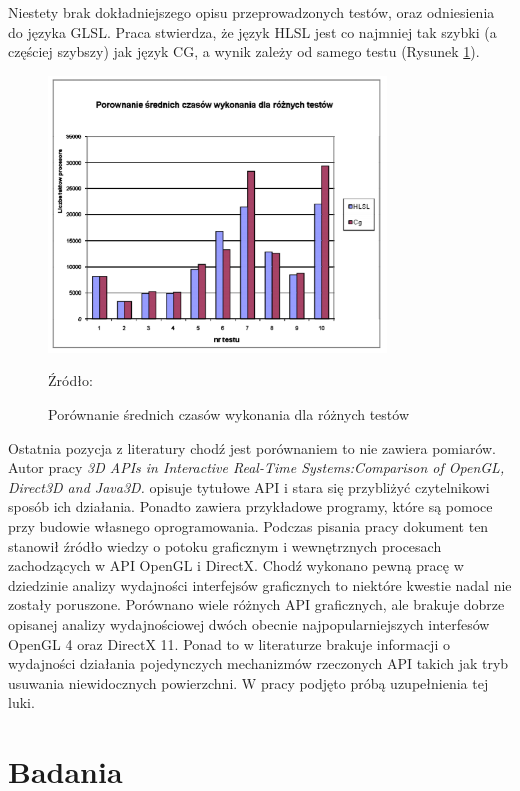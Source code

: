 \documentclass[archive]{mgr}
\begin{document}
Niestety brak dokładniejszego opisu przeprowadzonych testów, oraz odniesienia do języka GLSL. Praca stwierdza, że język HLSL jest co najmniej tak szybki (a częściej szybszy) jak język CG, a wynik zależy od samego testu (Rysunek \ref{lab:liter3}).


\begin{figure}[h!]
  \centering
    \includegraphics[width=0.8\textwidth]{images/lit/3.png}
   \caption{Porównanie średnich czasów wykonania dla różnych testów}
   Źródło: \cite{lit4}
   \label{lab:liter3}
\end{figure}


Ostatnia pozycja z literatury chodź jest porównaniem to nie zawiera pomiarów. Autor pracy \emph{3D APIs in Interactive
Real-Time Systems:Comparison of OpenGL, Direct3D and Java3D.} \cite{compar} opisuje tytułowe API i stara się przybliżyć czytelnikowi sposób ich działania. Ponadto zawiera przykładowe programy, które są pomoce przy budowie własnego oprogramowania. Podczas pisania pracy dokument ten stanowił źródło wiedzy o potoku graficznym i wewnętrznych procesach zachodzących w API OpenGL i DirectX.
\newpage
Chodź wykonano pewną pracę w dziedzinie analizy wydajności interfejsów graficznych to niektóre kwestie nadal nie zostały poruszone. Porównano wiele różnych API graficznych, ale brakuje dobrze opisanej analizy wydajnościowej dwóch obecnie najpopularniejszych interfesów OpenGL 4 oraz DirectX 11. Ponad to w literaturze brakuje informacji o wydajności działania pojedynczych mechanizmów rzeczonych API takich jak tryb usuwania niewidocznych powierzchni. W pracy podjęto próbą uzupełnienia tej luki.



\chapter{Badania}
\end{document}
